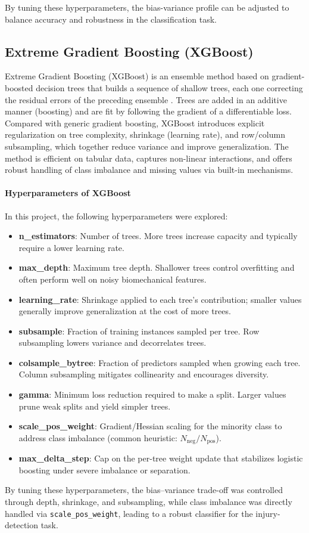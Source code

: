 By tuning these hyperparameters, the bias-variance profile can be adjusted to balance accuracy and robustness in the classification task.

\subsection{Extreme Gradient Boosting (XGBoost)}\label{subsec:method-xgboost}
Extreme Gradient Boosting (XGBoost) is an ensemble method based on gradient-boosted decision trees that builds a sequence of shallow trees, each one correcting the residual errors of the preceding ensemble \citep{Chen2016XGBoost}. Trees are added in an additive manner (boosting) and are fit by following the gradient of a differentiable loss. Compared with generic gradient boosting, XGBoost introduces explicit regularization on tree complexity, shrinkage (learning rate), and row/column subsampling, which together reduce variance and improve generalization. The method is efficient on tabular data, captures non-linear interactions, and offers robust handling of class imbalance and missing values via built-in mechanisms.

\paragraph{Hyperparameters of XGBoost}
In this project, the following hyperparameters were explored:
\begin{itemize}
    \item \textbf{n\_estimators}: Number of trees. More trees increase capacity and typically require a lower learning rate.
    \item \textbf{max\_depth}: Maximum tree depth. Shallower trees control overfitting and often perform well on noisy biomechanical features.
    \item \textbf{learning\_rate}: Shrinkage applied to each tree's contribution; smaller values generally improve generalization at the cost of more trees.
    \item \textbf{subsample}: Fraction of training instances sampled per tree. Row subsampling lowers variance and decorrelates trees.
    \item \textbf{colsample\_bytree}: Fraction of predictors sampled when growing each tree. Column subsampling mitigates collinearity and encourages diversity.
    \item \textbf{gamma}: Minimum loss reduction required to make a split. Larger values prune weak splits and yield simpler trees.
    \item \textbf{scale\_pos\_weight}: Gradient/Hessian scaling for the minority class to address class imbalance (common heuristic: $N_{\text{neg}}/N_{\text{pos}}$).
    \item \textbf{max\_delta\_step}: Cap on the per-tree weight update that stabilizes logistic boosting under severe imbalance or separation.
\end{itemize}
By tuning these hyperparameters, the bias--variance trade-off was controlled through depth, shrinkage, and subsampling, while class imbalance was directly handled via \texttt{scale\_pos\_weight}, leading to a robust classifier for the injury-detection task.

